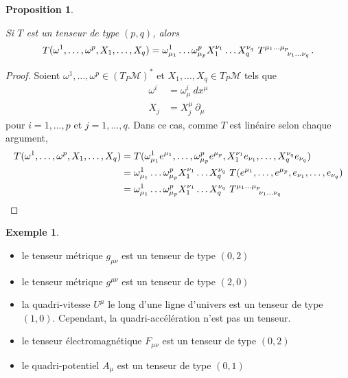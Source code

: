 \documentclass[a4paper,11pt]{report}
\theoremstyle{definition}
\theoremstyle{plain}
\newtheorem{prop}[thm]{Proposition}
\theoremstyle{definition}
\newtheorem{exmp}{Exemple}[chapter]
\theoremstyle{remark}
\newcommand{\M}{\mathscr{M}}
\newcommand{\p}{\partial}
\begin{document}
                \begin{prop}\begin{leftbar}
                    Si $T$ est un tenseur de type $(p,q)$, alors
                    \begin{equation}
                        T(\omega^1,\dots,\omega^p,X_1,\dots,X_q) = \omega^1_{\mu_1}\dots\omega^p_{\mu_p}X^{\nu_1}_1\dots X^{\nu_q}_q~ T\indices{^{\mu_1\dots\mu_p}_{\nu_1\dots\nu_q}}.
                    \end{equation}
                \end{leftbar}\end{prop}
                
                \begin{proof}
                    Soient $\omega^1,\dots,\omega^p\in(T_P\M)^*$ et $X_1,\dots,X_q\in T_P\M$ tels que 
                    \begin{align}
                        \omega^i &= \omega^i_\mu ~dx^\mu \\
                        X_j &= X^\mu_j~\p_\mu
                    \end{align}
                    pour $i=1,\dots,p$ et $j=1,\dots,q$. Dans ce cas, comme $T$ est linéaire selon chaque argument,
                    \begin{align}
                        T(\omega^1,\dots,\omega^p,X_1,\dots,X_q) &= T(\omega^1_{\mu_1}e^{\mu_1},\dots,\omega^p_{\mu_p}e^{\mu_p},X^{\nu_1}_1e_{\nu_1},\dots,X^{\nu_q}_qe_{\nu_q}) \\
                        &=\omega^1_{\mu_1}\dots\omega^p_{\mu_p}X^{\nu_1}_1\dots X^{\nu_q}_q~T(e^{\mu_1},\dots,e^{\mu_p},e_{\nu_1},\dots,e_{\nu_q}) \\
                        &= \omega^1_{\mu_1}\dots\omega^p_{\mu_p}X^{\nu_1}_1\dots X^{\nu_q}_q~ T\indices{^{\mu_1\dots\mu_p}_{\nu_1\dots\nu_q}}
                    \end{align}
                \end{proof}
                
                \begin{exmp}${}$
                    \begin{itemize}[label = \textbullet]
                        \item le tenseur métrique $g_{\mu\nu}$ est un tenseur de type $(0,2)$
                        \item le tenseur métrique $g^{\mu\nu}$ est un tenseur de type $(2,0)$
                        \item la quadri-vitesse $U^{\mu}$ le long d'une ligne d'univers est un tenseur de type $(1,0)$. Cependant, la quadri-accélération n'est pas un tenseur.
                        \item le tenseur électromagnétique $F_{\mu\nu}$ est un tenseur de type $(0,2)$
                        \item le quadri-potentiel $A_{\mu}$ est un tenseur de type $(0,1)$
                    \end{itemize}
                \end{exmp}
                
\end{document}
